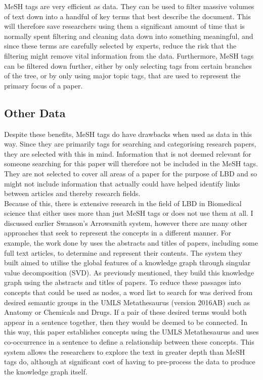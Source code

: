 \documentclass{l4proj}
\begin{document}
MeSH tags are very efficient as data. They can be used to filter massive volumes of text down into a handful of key terms that best describe the document. This will therefore save researchers using them a significant amount of time that is normally spent filtering and cleaning data down into something meaningful, and since these terms are carefully selected by experts, reduce the risk that the filtering might remove vital information from the data. Furthermore, MeSH tags can be filtered down further, either by only selecting tags from certain branches of the tree, or by only using major topic tags, that are used to represent the primary focus of a paper. \\

\subsection{Other Data}

Despite these benefits, MeSH tags do have drawbacks when used as data in this way. Since they are primarily tags for searching and categorising research papers, they are selected with this in mind. Information that is not deemed relevant for someone searching for this paper will therefore not be included in the MeSH tags. They are not selected to cover all areas of a paper for the purpose of LBD and so might not include information that actually could have helped identify links between articles and thereby research fields. \\
 
Because of this, there is extensive research in the field of LBD in Biomedical science that either uses more than just MeSH tags or does not use them at all. I discussed earlier Swanson's Arrowsmith system, however there are many other approaches that seek to represent the concepts in a different manner. For example, the work done by \cite{lever_collaborative_2018} uses the abstracts and titles of papers, including some full text articles, to determine and represent their contents. The system they built aimed to utilise the global features of a knowledge graph through singular value decomposition (SVD). As previously mentioned, they build this knowledge graph using the abstracts and titles of papers. To reduce these passages into concepts that could be used as nodes, a word list to search for was derived from desired semantic groups in the UMLS Metathesaurus (version 2016AB) such as Anatomy or Chemicals and Drugs. If a pair of these desired terms would both appear in a sentence together, then they would be deemed to be connected. In this way, this paper establishes concepts using the UMLS Metathesaurus and uses co-occurrence in a sentence to define a relationship between these concepts. This system allows the researchers to explore the text in greater depth than MeSH tags do, although at significant cost of having to  pre-process the data to produce the knowledge graph itself. \\ 
\end{document}
